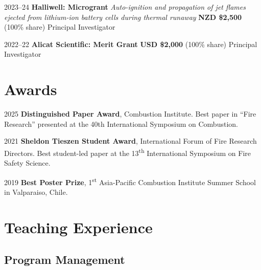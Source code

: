 \documentclass[12pt,letterpaper]{report}
\begin{document}
\begin{tablist}
    \item[2023--24] \tab \textbf{Halliwell: Microgrant} \newline
    \textit{Auto-ignition and propagation of jet flames ejected from lithium-ion battery cells during thermal runaway} \newline
    \textbf{NZD \$2,500} (100\% share) \newline
    Principal Investigator

    \item[2022--22] \tab \textbf{Alicat Scientific: Merit Grant} \newline
    \textbf{USD \$2,000} (100\% share) \newline
    Principal Investigator  

\end{tablist}

    \section*{Awards} %

    \begin{tablist}

        \item[2025] \tab \textbf{Distinguished Paper Award}, Combustion Institute. Best paper in \enquote{Fire Research} presented at the 40th International Symposium on Combustion. 
                    
        \item[2021] \tab \textbf{Sheldon Tieszen Student Award}, International Forum of Fire Research Directors. Best student-led paper at the 13\textsuperscript{th} International Symposium on Fire Safety Science. 

        \item[2019] \tab \textbf{Best Poster Prize}, 1\textsuperscript{st} Asia-Pacific Combustion Institute Summer School in Valparaiso, Chile. 
       
    \end{tablist} 

    \section*{Teaching Experience}

	\subsection*{Program Management}   
\end{document}
